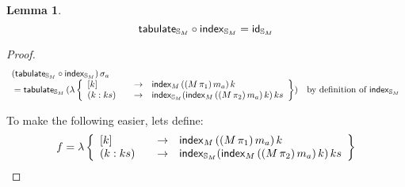 \documentclass{article}
\newtheorem{lemma}[definition]{Lemma}
\begin{document}
\begin{lemma}
$$
\mathsf{tabulate}_{\mathbb{S}_{M}} \circ \mathsf{index}_{\mathbb{S}_{M}} = \mathsf{id}_{\mathbb{S}_{M}}
$$
\end{lemma}
\begin{proof}

$$
\begin{array}{l l}
(\tabulatef_{\stream{M}} \circ \indexf_{\stream{M}})\, \sigma_a \\
{}= \tabulatef_{\stream{M}}\, (\lambda  
\left\{
\begin{array}{l@{\qquad}l l}
[k] &\to& \indexf_M\, ((M\,\pi_1)\,m_a)\, k\\
(k : ks) &\to& \indexf_{\stream{M}} (\indexf_M\, ((M\,\pi_2)\,m_a)\, k)\, ks
\end{array}
\right\}) &  \mbox{by definition of }\indexf_{\stream{M}} 
\end{array}
$$

To make the following easier, lets define:
$$
\begin{array}{l}
f = \lambda  
\left\{
\begin{array}{l@{\qquad}l l}
[k] &\to& \indexf_M\, ((M\,\pi_1)\,m_a)\, k\\
(k : ks) &\to& \indexf_{\stream{M}} (\indexf_M\, ((M\,\pi_2)\,m_a)\, k)\, ks
\end{array}
\right\}
\end{array}
$$


\end{proof}
\end{document}
